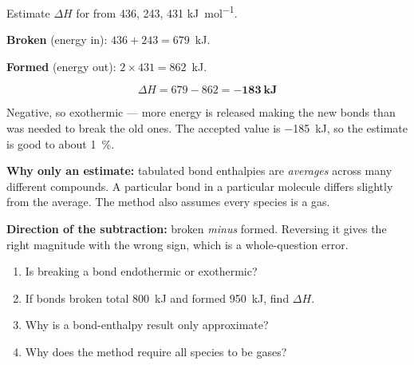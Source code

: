 \documentclass{apchem-worksheet}
\begin{document}
\begin{workedexample}
Estimate $\Delta H$ for  from
 436,  243,  431
\si{\kilo\joule\per\mole}.

\textbf{Broken} (energy in): $436 + 243 = \num{679}$~kJ.

\textbf{Formed} (energy out): $2 \times 431 = \num{862}$~kJ.

\[ \Delta H = 679 - 862 = \mathbf{-183~kJ} \]

Negative, so exothermic --- more energy is released making the new bonds
than was needed to break the old ones. The accepted value is
\SI{-185}{\kilo\joule}, so the estimate is good to about
\SI{1}{\percent}.

\textbf{Why only an estimate:} tabulated bond enthalpies are
\emph{averages} across many different compounds. A particular 
bond in a particular molecule differs slightly from the average. The
method also assumes every species is a gas.

\textbf{Direction of the subtraction:} broken \emph{minus} formed.
Reversing it gives the right magnitude with the wrong sign, which is a
whole-question error.
\end{workedexample}

\begin{yourturn}
\begin{enumerate}[leftmargin=*,itemsep=0.5em]
  \item Is breaking a bond endothermic or exothermic?
        \workspace[1.4cm]
  \item If bonds broken total \SI{800}{\kilo\joule} and formed
        \SI{950}{\kilo\joule}, find $\Delta H$. \workspace[1.6cm]
  \item Why is a bond-enthalpy result only approximate?
        \workspace[1.8cm]
  \item Why does the method require all species to be gases?
        \workspace[1.8cm]
\end{enumerate}
\end{yourturn}
\end{document}
